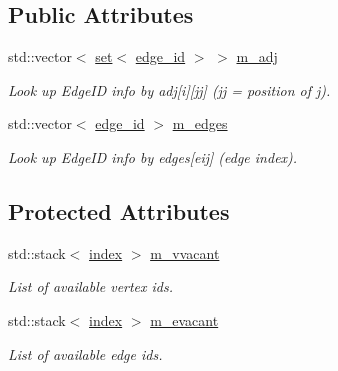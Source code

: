 \subsection*{Public Attributes}
\begin{DoxyCompactItemize}
\item 
std\+::vector$<$ \hyperlink{classmerlin_1_1set}{set}$<$ \hyperlink{structmerlin_1_1edge__id}{edge\+\_\+id} $>$ $>$ \hyperlink{classmerlin_1_1graph_a71cf7768aa72159f3ae7b52ef6b23993}{m\+\_\+adj}\hypertarget{classmerlin_1_1graph_a71cf7768aa72159f3ae7b52ef6b23993}{}\label{classmerlin_1_1graph_a71cf7768aa72159f3ae7b52ef6b23993}

\begin{DoxyCompactList}\small\item\em Look up Edge\+ID info by adj\mbox{[}i\mbox{]}\mbox{[}jj\mbox{]} (jj = position of j). \end{DoxyCompactList}\item 
std\+::vector$<$ \hyperlink{structmerlin_1_1edge__id}{edge\+\_\+id} $>$ \hyperlink{classmerlin_1_1graph_a6ff5b1d6713ff82d50f9888f2b60390f}{m\+\_\+edges}\hypertarget{classmerlin_1_1graph_a6ff5b1d6713ff82d50f9888f2b60390f}{}\label{classmerlin_1_1graph_a6ff5b1d6713ff82d50f9888f2b60390f}

\begin{DoxyCompactList}\small\item\em Look up Edge\+ID info by edges\mbox{[}eij\mbox{]} (edge index). \end{DoxyCompactList}\end{DoxyCompactItemize}
\subsection*{Protected Attributes}
\begin{DoxyCompactItemize}
\item 
std\+::stack$<$ \hyperlink{classmerlin_1_1graph_a5cade38832f47248573e921276f122d6}{index} $>$ \hyperlink{classmerlin_1_1graph_a6b3ab6e44183a8b27bb04f93166fbffb}{m\+\_\+vvacant}\hypertarget{classmerlin_1_1graph_a6b3ab6e44183a8b27bb04f93166fbffb}{}\label{classmerlin_1_1graph_a6b3ab6e44183a8b27bb04f93166fbffb}

\begin{DoxyCompactList}\small\item\em List of available vertex ids. \end{DoxyCompactList}\item 
std\+::stack$<$ \hyperlink{classmerlin_1_1graph_a5cade38832f47248573e921276f122d6}{index} $>$ \hyperlink{classmerlin_1_1graph_a9ebdd8a3cfe95f6159759c41836bf495}{m\+\_\+evacant}\hypertarget{classmerlin_1_1graph_a9ebdd8a3cfe95f6159759c41836bf495}{}\label{classmerlin_1_1graph_a9ebdd8a3cfe95f6159759c41836bf495}

\begin{DoxyCompactList}\small\item\em List of available edge ids. \end{DoxyCompactList}\end{DoxyCompactItemize}


